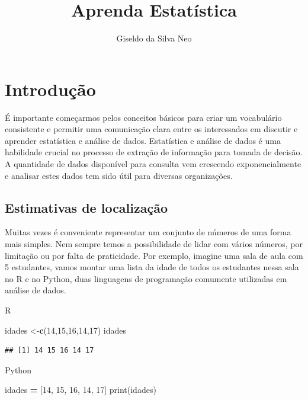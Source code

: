 \documentclass[
]{book}
\title{Aprenda Estatística}
\author{Giseldo da Silva Neo}
\date{}
\newenvironment{Shaded}{\begin{snugshade}}{\end{snugshade}}
\newcommand{\BuiltInTok}[1]{#1}
\newcommand{\DecValTok}[1]{\textcolor[rgb]{0.00,0.00,0.81}{#1}}
\newcommand{\FunctionTok}[1]{\textcolor[rgb]{0.13,0.29,0.53}{\textbf{#1}}}
\newcommand{\NormalTok}[1]{#1}
\newcommand{\OperatorTok}[1]{\textcolor[rgb]{0.81,0.36,0.00}{\textbf{#1}}}
\newcommand{\OtherTok}[1]{\textcolor[rgb]{0.56,0.35,0.01}{#1}}
\begin{document}
\maketitle

{
\setcounter{tocdepth}{1}
\tableofcontents
}
\hypertarget{introduuxe7uxe3o}{%
\chapter{Introdução}\label{introduuxe7uxe3o}}

É importante começarmos pelos conceitos básicos para criar um vocabulário consistente e permitir uma comunicação clara entre os interessados em discutir e aprender estatística e análise de dados. Estatística e análise de dados é uma habilidade crucial no processo de extração de informação para tomada de decisão. A quantidade de dados disponível para consulta vem crescendo exponencialmente e analisar estes dados tem sido útil para diversas organizações.

\hypertarget{estimativas-de-localizauxe7uxe3o}{%
\section{Estimativas de localização}\label{estimativas-de-localizauxe7uxe3o}}

Muitas vezes é conveniente representar um conjunto de números de uma forma mais simples. Nem sempre temos a possibilidade de lidar com vários números, por limitação ou por falta de praticidade. Por exemplo, imagine uma sala de aula com 5 estudantes, vamos montar uma lista da idade de todos os estudantes nessa sala no R e no Python, duas linguagens de programação comumente utilizadas em análise de dados.

R

\begin{Shaded}
\begin{Highlighting}[]
\NormalTok{idades }\OtherTok{\textless{}{-}}\FunctionTok{c}\NormalTok{(}\DecValTok{14}\NormalTok{,}\DecValTok{15}\NormalTok{,}\DecValTok{16}\NormalTok{,}\DecValTok{14}\NormalTok{,}\DecValTok{17}\NormalTok{)}
\NormalTok{idades}
\end{Highlighting}
\end{Shaded}

\begin{verbatim}
## [1] 14 15 16 14 17
\end{verbatim}

Python

\begin{Shaded}
\begin{Highlighting}[]
\NormalTok{idades }\OperatorTok{=}\NormalTok{ [}\DecValTok{14}\NormalTok{, }\DecValTok{15}\NormalTok{, }\DecValTok{16}\NormalTok{, }\DecValTok{14}\NormalTok{, }\DecValTok{17}\NormalTok{]}
\BuiltInTok{print}\NormalTok{(idades)}
\end{Highlighting}
\end{Shaded}
\end{document}
